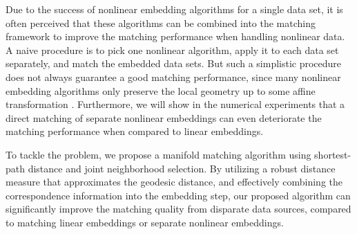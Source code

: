 \documentclass[times,twocolumn,final]{elsarticle}
\begin{document}
Due to the success of nonlinear embedding algorithms for a single data set, it is often perceived that these algorithms can be combined into the matching framework to improve the matching performance when handling nonlinear data. A naive procedure is to pick one nonlinear algorithm, apply it to each data set separately, and match the embedded data sets. But such a simplistic procedure does not always guarantee a good matching performance, since many nonlinear embedding algorithms only preserve the local geometry up to some affine transformation \citep{GoldbergRitov2008}. Furthermore, we will show in the numerical experiments that a direct matching of separate nonlinear embeddings can even deteriorate the matching performance when compared to linear embeddings.
%
%
%
%
%
%
%

To tackle the problem, we propose a manifold matching algorithm using shortest-path distance and joint neighborhood selection. By utilizing a robust distance measure that approximates the geodesic distance, and effectively combining the correspondence information into the embedding step, our proposed algorithm can significantly improve the matching quality from disparate data sources, compared to matching linear embeddings or separate nonlinear embeddings. %
\end{document}
